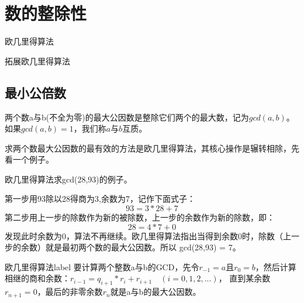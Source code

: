 \chapter{数的整除性}
\begin{introduction}[本章内容提要]
	\item 欧几里得算法
	\item 拓展欧几里得算法
\end{introduction}

\section{最小公倍数}
两个数a与b(不全为零)的最大公因数是整除它们两个的最大数，记为$gcd(a,b)$。如果$gcd(a,b)=1$，我们称$a$与$b$互质。

求两个数最大公因数的最有效的方法是{\heiti 欧几里得算法}，其核心操作是辗转相除，先看一个例子。

\begin{example}
	欧几里得算法求gcd(28,93)的例子。
	
	第一步用93除以28得商为3,余数为7，记作下面式子：
	$$
		93 = 3*28 + 7
	$$
	第二步用上一步的除数作为新的被除数，上一步的余数作为新的除数，即：
	$$
		28 = 4*7 + 0
	$$
	发现此时余数为0，算法不再继续。欧几里得算法指出当得到余数0时，除数（上一步的余数）就是最初两个数的最大公因数。所以
	gcd(28,93) = 7。
\end{example}

\begin{theorem}{欧几里得算法}{label}
	要计算两个整数a与b的GCD，先令$r_{-1}=a$且$r_{0}=b$，然后计算相继的商和余数：$r_{i-1}=q_{i+1}*r_{i}+r_{i+1} \quad (i=0,1,2,...)$，
	直到某余数$r_{n+1}=0$，最后的非零余数$r_{n}$就是a与b的最大公因数。
\end{theorem}

